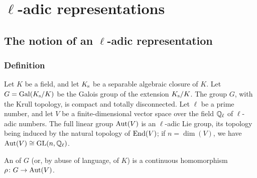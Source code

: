 \chapter{\texorpdfstring{$\ell$}{ℓ}-adic representations}%
\label{ch:i}

\section{The notion of an \texorpdfstring{$\ell$}{ℓ}-adic representation}%
\label{sec:I_1}

\subsection{Definition}\label{sec:I_11}
Let $K$ be a field,
\dpage
and let $K_{\mathrm{s}}$ be a separable algebraic closure of $K$.  Let $G =
\operatorname{Gal}(K_{\mathrm{s}} / K)$ be the Galois group of the extension $K_{\mathrm{s}}/K$.
The group $G$, with the Krull topology, is compact and totally disconnected.
Let $\ell$ be a prime number, and let $V$ be a finite-dimensional vector space
over the field $\mathbb{Q}_\ell$ of $\ell$-adic numbers.  The full linear group
$\operatorname{Aut}(V)$ is an $\ell$-adic Lie group, its topology being induced by the
natural topology of $\operatorname{End}(V)$; if $n = \dim(V)$, we have $\operatorname{Aut}(V) \cong \operatorname{GL}(n,
\mathbb{Q}_\ell)$.

\begin{mydef}
An  of $G$ (or, by abuse of language, of $K$) is a continuous
homomorphism $\rho \colon G \to \operatorname{Aut}(V)$.
\end{mydef}

